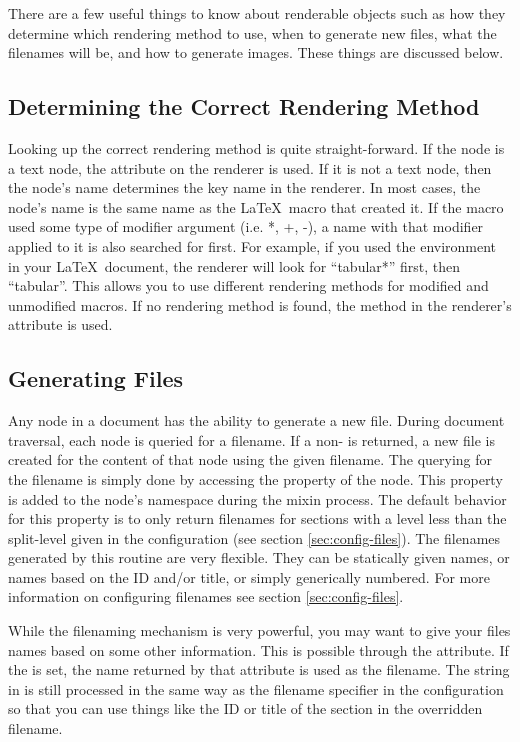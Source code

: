 There are a few useful things to know about renderable objects such as
how they determine which rendering method to use, when to generate new
files, what the filenames will be, and how to generate images.  These
things are discussed below.


\subsection{Determining the Correct Rendering Method}

Looking up the correct rendering method is quite straight-forward.
If the node is a text node, the  attribute on
the renderer is used.  If it is not a text node, then the node's name
determines the key name in the renderer.  In most cases, the node's
name is the same name as the \LaTeX\ macro that created it.  If the
macro used some type of modifier argument (i.e. *, +, -), a name
with that modifier applied to it is also searched for first.  For example,
if you used the  environment in your \LaTeX\
document, the renderer will look for ``tabular*'' first, then ``tabular''.
This allows you to use different rendering methods for modified and
unmodified macros.  If no rendering method is found, the method
in the renderer's  attribute is used.


\subsection{Generating Files}

Any node in a document has the ability to generate a new file.
During document traversal, each node is queried for a filename.  If
a non-\var{None} is returned, a new file is created for the content
of that node using the given filename.  The querying for the filename
is simply done by accessing the \member{filename} property of the
node.  This property is added to the node's namespace during the
mixin process.  The default behavior for this property is to only
return filenames for sections with a level less than the split-level
given in the configuration (see section \ref{sec:config-files}).
The filenames generated by this routine are very flexible.  They can
be statically given names, or names based on the ID and/or title,
or simply generically numbered.  For more information on configuring
filenames see section \ref{sec:config-files}.

While the filenaming mechanism is very powerful, you may want to give
your files names based on some other information.  This is possible through
the  attribute.  If the 
is set, the name returned by that attribute is used as the filename.
The string in \member{filenameoverride} is still processed in the same
way as the filename specifier in the configuration so that you can
use things like the ID or title of the section in the overridden filename.

